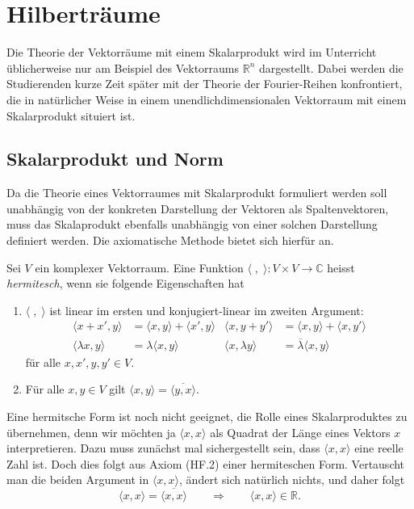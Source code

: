 %
%
%
\chapter{Hilberträume
\label{chapter:hilbertspaces}}
Die Theorie der Vektorräume mit einem Skalarprodukt wird im Unterricht
üblicherweise nur am Beispiel des Vektorraums $\mathbb R^n$ dargestellt.
Dabei werden die Studierenden kurze Zeit später mit der Theorie
der Fourier-Reihen konfrontiert, die in natürlicher Weise in einem
unendlichdimensionalen Vektorraum mit einem Skalarprodukt situiert ist.

\section{Skalarprodukt und Norm}
Da die Theorie eines Vektorraumes mit Skalarprodukt formuliert werden
soll unabhängig von der konkreten Darstellung der Vektoren als 
Spaltenvektoren, muss das Skalaprodukt ebenfalls unabhängig von einer
solchen Darstellung definiert werden.
Die axiomatische Methode bietet sich hierfür an.

\begin{definition}
\label{hilbert:hermitescheform}
Sei $V$ ein komplexer Vektorraum.
Eine Funktion $\langle\;,\;\rangle\colon V\times V\to\mathbb C$ heisst
{\em hermitesch}, wenn sie folgende Eigenschaften hat
\begin{enumerate}[label={\bf HF.\arabic*},itemsep=0mm]
\item $\langle\;,\;\rangle$ ist linear im ersten und konjugiert-linear
im zweiten Argument:
\begin{align*}
\langle x+x',y\rangle &=\langle x,y\rangle + \langle x',y\rangle
&
\langle x,y+y'\rangle &=\langle x,y\rangle + \langle x,y'\rangle
\\
\langle\lambda x,y\rangle&=\lambda\langle x,y\rangle
&
\langle x,\lambda y\rangle&=\overline\lambda\langle x,y\rangle
\end{align*}
für alle $x,x',y,y'\in V$.
\item Für alle $x,y\in V$ gilt
$\langle x,y\rangle=\overline{\langle y,x\rangle}$.
\end{enumerate}
\end{definition}
Eine hermitsche Form ist noch nicht geeignet, die Rolle eines
Skalarproduktes zu übernehmen, denn wir möchten ja $\langle x,x\rangle$
als Quadrat der Länge eines Vektors $x$ interpretieren.
Dazu muss zunächst mal sichergestellt sein, dass $\langle x,x\rangle$
eine reelle Zahl ist.
Doch dies folgt aus Axiom (HF.2) einer hermiteschen Form.
Vertauscht man die beiden Argument in $\langle x,x\rangle$, ändert
sich natürlich nichts, und daher folgt
\[
\langle x,x\rangle = \overline{\langle x,x\rangle}
\qquad\Rightarrow\qquad
\langle x,x\rangle\in\mathbb R.
\]

